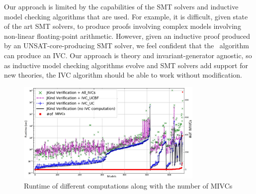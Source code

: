 Our approach is limited by the capabilities of the SMT solvers and inductive model checking algorithms that are used.  For example, it is difficult, given state of the art SMT solvers, to produce proofs involving complex models involving non-linear floating-point arithmetic.  However, given an inductive proof produced by an UNSAT-core-producing SMT solver, we feel confident that the \ucalg\ algorithm can produce an IVC.  Our approach is theory and invariant-generator agnostic, so as inductive model checking algorithms evolve and SMT solvers add support for new theories, the IVC algorithm should be able to work without modification.




 \begin{figure}
 \centering
  \includegraphics[width=0.8\textwidth]{figs/size.jpg}
  \caption{Runtime of different computations along with the number of MIVCs}
  \vspace{0.1in}
  \label{fig:modelsize}
\end{figure}


